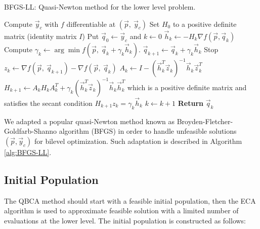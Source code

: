 \documentclass[conference]{IEEEtran}
\theoremstyle{definition}
\begin{document}
\begin{algorithm}[htbp]
    \caption{BFGS-LL: Quasi-Newton method for the lower level problem.}
    \label{alg:BFGS-LL}
    \begin{algorithmic}[1]
        \STATE Compute $\vec{y}_c$ with $f$ differentiable at $(\vec{p},\ \vec{y}_c)$
        \STATE Set $H_0$ to a positive definite matrix (identity matrix $I$)
        \STATE Put $\vec{q}_0 \gets \vec{y}_c$ and $k \gets 0$
            \STATE $\vec{h}_k \gets -H_k\nabla f(\vec{p}, \vec{q}_k)$
            \STATE Compute $\gamma_{k}\gets\arg \min f(\vec{p}, \ \vec{q} _{k}+ \gamma_k \vec{h} _{k})$.
            \STATE $\vec{q}_{k+1} \gets \vec{q}_k  + \gamma_k \vec{h}_k$
                \STATE Stop
            \ENDIF
            \STATE $z_k \gets \nabla f(\vec{p}, \ \vec{q}_{k+1}) - \nabla f(\vec{p}, \ \vec{q}_{k}) $
            \STATE $\displaystyle A_k \gets I - (\vec{h}_k^T \vec{z}_k)^{-1} \vec{h}_k \vec{z}_k^T$
            \STATE $H_{k+1} \gets A_k H_k A_k^T + \gamma_k(\vec{h}_k^T\vec{z}_k)^{-1}\vec{h}_k \vec{h}_k^T$
                   which is a positive definite matrix and satisfies the secant
                   condition $H_{k+1} z_k = \gamma_k \vec{h}_k$
            \STATE $k \gets k + 1$
        \ENDWHILE
        \STATE \textbf{Return} $\vec{q}_k$
    \end{algorithmic}
\end{algorithm}

We adapted a popular quasi-Newton method known as Broyden-Fletcher-Goldfarb-Shanno
algorithm (BFGS) \cite{fletcher2013practical} in order to handle unfeasible
solutions $(\vec{p}, \vec{y}_c)$ for bilevel optimization. Such adaptation is
described in Algorithm \ref{alg:BFGS-LL}.
% 

\subsection{Initial Population} %
\label{sub:initial_population}


The QBCA method should start with a feasible initial population, then the ECA
algorithm \cite{Mejia2018} is used to approximate feasible solution with a limited
number of evaluations at the lower level. The initial population is constructed
as follows:
\end{document}

